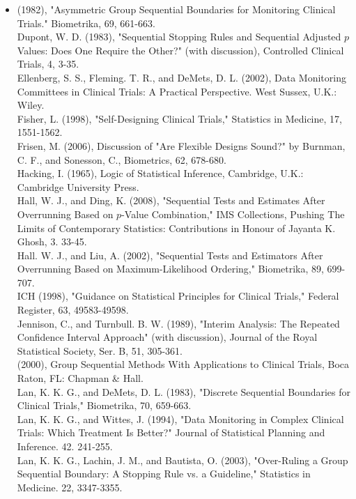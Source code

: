 \documentclass[10pt]{article}
\begin{document}
\begin{itemize}
  \item (1982), "Asymmetric Group Sequential Boundaries for Monitoring Clinical Trials." Biometrika, 69, 661-663.\\
Dupont, W. D. (1983), "Sequential Stopping Rules and Sequential Adjusted $p$ Values: Does One Require the Other?" (with discussion), Controlled Clinical Trials, 4, 3-35.\\
Ellenberg, S. S., Fleming. T. R., and DeMets, D. L. (2002), Data Monitoring Committees in Clinical Trials: A Practical Perspective. West Sussex, U.K.: Wiley.\\
Fisher, L. (1998), "Self-Designing Clinical Trials," Statistics in Medicine, 17, 1551-1562.\\
Frisen, M. (2006), Discussion of "Are Flexible Designs Sound?" by Burnman, C. F., and Sonesson, C., Biometrics, 62, 678-680.\\
Hacking, I. (1965), Logic of Statistical Inference, Cambridge, U.K.: Cambridge University Press.\\
Hall, W. J., and Ding, K. (2008), "Sequential Tests and Estimates After Overrunning Based on $p$-Value Combination," IMS Collections, Pushing The Limits of Contemporary Statistics: Contributions in Honour of Jayanta K. Ghosh, 3. 33-45.\\
Hall. W. J., and Liu, A. (2002), "Sequential Tests and Estimators After Overrunning Based on Maximum-Likelihood Ordering," Biometrika, 89, 699-707.\\
ICH (1998), "Guidance on Statistical Principles for Clinical Trials," Federal Register, 63, 49583-49598.\\
Jennison, C., and Turnbull. B. W. (1989), "Interim Analysis: The Repeated Confidence Interval Approach" (with discussion), Journal of the Royal Statistical Society, Ser. B, 51, 305-361.\\
(2000), Group Sequential Methods With Applications to Clinical Trials, Boca Raton, FL: Chapman \& Hall.\\
Lan, K. K. G., and DeMets, D. L. (1983), "Discrete Sequential Boundaries for Clinical Trials," Biometrika, 70, 659-663.\\
Lan, K. K. G., and Wittes, J. (1994), "Data Monitoring in Complex Clinical Trials: Which Treatment Is Better?" Journal of Statistical Planning and Inference. 42. 241-255.\\
Lan, K. K. G., Lachin, J. M., and Bautista, O. (2003), "Over-Ruling a Group Sequential Boundary: A Stopping Rule vs. a Guideline," Statistics in Medicine. 22, 3347-3355.\\

\end{itemize}
\end{document}
